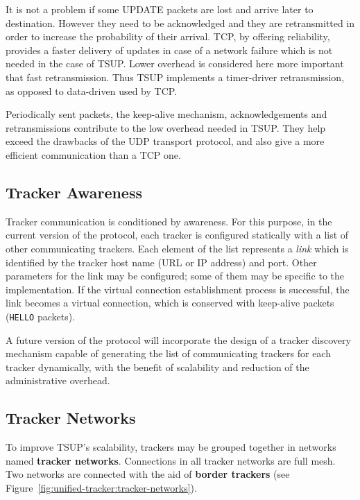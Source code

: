 It is not a problem if some UPDATE packets are lost and arrive later to
destination. However they need to be acknowledged and they are retransmitted
in order to increase the probability of their arrival. TCP, by offering
reliability, provides a faster delivery of updates in case of a network
failure which is not needed in the case of TSUP. Lower overhead is considered
here more important that fast retransmission. Thus TSUP implements a
timer-driver retransmission, as opposed to data-driven used by TCP.

Periodically sent packets, the keep-alive mechanism, acknowledgements and
retransmissions contribute to the low overhead needed in TSUP. They help
exceed the drawbacks of the UDP transport protocol, and also give a more
efficient communication than a TCP one.

\subsection{Tracker Awareness}
\label{subsec:unified-tracker:tracker-awareness}

Tracker communication is conditioned by awareness. For this purpose, in the
current version of the protocol, each tracker is configured statically with a
list of other communicating trackers. Each element of the list represents a
\textit{link} which is identified by the tracker host name (URL or IP address)
and port. Other parameters for the link may be configured; some of them may be
specific to the implementation. If the virtual connection establishment
process is successful, the link becomes a virtual connection, which is
conserved with keep-alive packets (\texttt{HELLO} packets).

A future version of the protocol will incorporate the design of a tracker
discovery mechanism capable of generating the list of communicating trackers
for each tracker dynamically, with the benefit of scalability and reduction of
the administrative overhead.

\subsection{Tracker Networks}
\label{subsec:unified-tracker:tracker-networks}

To improve TSUP's scalability, trackers may be grouped together in networks
named \textbf{tracker networks}. Connections in all tracker networks are full
mesh. Two networks are connected with the aid of \textbf{border trackers} (see
Figure~\ref{fig:unified-tracker:tracker-networks}).

